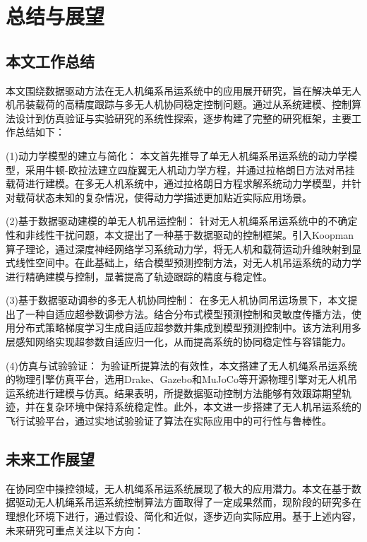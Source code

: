 \documentclass[lang=chs, degree=master, blindreview=false, winfonts=true]{yanputhesis}
\begin{document}
\cleardoublepage

\chapter{总结与展望}


\section{本文工作总结}
本文围绕数据驱动方法在无人机绳系吊运系统中的应用展开研究，旨在解决单无人机吊装载荷的高精度跟踪与多无人机协同稳定控制问题。通过从系统建模、控制算法设计到仿真验证与实验研究的系统性探索，逐步构建了完整的研究框架，主要工作总结如下：

(1)动力学模型的建立与简化：
本文首先推导了单无人机绳系吊运系统的动力学模型，采用牛顿-欧拉法建立四旋翼无人机动力学方程，并通过拉格朗日方法对吊挂载荷进行建模。在多无人机系统中，通过拉格朗日方程求解系统动力学模型，并针对载荷状态未知的复杂情况，使得动力学描述更加贴近实际应用场景。

(2)基于数据驱动建模的单无人机吊运控制：
针对无人机绳系吊运系统中的不确定性和非线性干扰问题，本文提出了一种基于数据驱动的控制框架。引入Koopman算子理论，通过深度神经网络学习系统动力学，将无人机和载荷运动升维映射到显式线性空间中。在此基础上，结合模型预测控制方法，对无人机吊运系统的动力学进行精确建模与控制，显著提高了轨迹跟踪的精度与稳定性。

(3)基于数据驱动调参的多无人机协同控制：
在多无人机协同吊运场景下，本文提出了一种自适应超参数调参方法。结合分布式模型预测控制和灵敏度传播方法，使用分布式策略梯度学习生成自适应超参数并集成到模型预测控制中。该方法利用多层感知网络实现超参数自适应归一化，从而提高系统的协同稳定性与容错能力。

(4)仿真与试验验证：
为验证所提算法的有效性，本文搭建了无人机绳系吊运系统的物理引擎仿真平台，选用Drake、Gazebo和MuJoCo等开源物理引擎对无人机吊运系统进行建模与仿真。结果表明，所提数据驱动控制方法能够有效跟踪期望轨迹，并在复杂环境中保持系统稳定性。此外，本文进一步搭建了无人机吊运系统的飞行试验平台，通过实地试验验证了算法在实际应用中的可行性与鲁棒性。

\section{未来工作展望}
在协同空中操控领域，无人机绳系吊运系统展现了极大的应用潜力。本文在基于数据驱动无人机绳系吊运系统控制算法方面取得了一定成果然而，现阶段的研究多在理想化环境下进行，通过假设、简化和近似，逐步迈向实际应用。基于上述内容，未来研究可重点关注以下方向：
\end{document}
